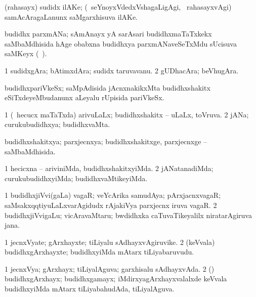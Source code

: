 \bentry
{}
\gl{\nA}
\bmng
(rahasayx) sudidx ilAKe; (\kanmu\ seYnoyxVdedxVshagaLigAgi, \kanmu\ rahasayxvAgi) samAcAragaLanunx saMgarxhisuva ilAKe. 
\emng
\eentry

\bentry
{}
\gl{\nA}
\bmng
budidhx parxmANa; sAmAnayx yA sarAsari budidhxmaTaTxkekx saMbaMdhisida hAge obabxna budidhxya parxmANaveSeTxMdu sUcisuva saMKeyx (\saMkiSx\ ). 
\emng
\eentry

\bentry
{}
\gl{\nA}
\bmng
\bnum
\num{1} sudidxgAra; bAtimxdAra; sudidx taruvavanu. 
\num{2} gUDhacAra; beVhugAra. 
\enum
\emng
\eentry

\bentry
{}
\gl{\nA}
\bmng
budidhxpariVkeSx; saMpAdisida jAcnxnakikxMta budidhxshakitx eSiTxdeyeMbudanunx aLeyalu rUpisida pariVkeSx. 
\emng
\eentry

\bentry
{}
\gl{\gu}
\bmng
\bnum
\num{1} (\sA\ hecucx maTaTxda) arivuLaLx; budidhxshakitx -- uLaLx, toVruva. 
\num{2} jANa; curukubudidhxya; budidhxvaMta. 
\enum
\emng
\eentry

\bentry
{}
\gl{\gu}
\bmng
budidhxshakitxya; parxjecnxya; budidhxshakitxge, parxjecnxge -- saMbaMdhisida. 
\emng
\eentry

\bentry
{}
\gl{\kirxvi}
\bmng
\bnum
\num{1} hecicxna -- ariviniMda, budidhxshakitxyiMda. 
\num{2} jANatanadiMda; curukubudidhxyiMda; budidhxvaMtikeyiMda. 
\enum
\emng
\eentry

\bentry
{}
\gl{\nA}
\bmng
\bnum
\num{1} budidhxjiVvi(gaLa) vagaR; veYcArika samudAya; pArxjacnxvagaR; saMsakxqqtiyuLaLxvarAgidudx rAjakiVya parxjecnx iruva vagaR. 
\num{2} budidhxjiVvigaLu; vicAravaMtaru; bwdidhxka caTuvaTikeyalilx niratarAgiruva jana. 
\enum
\emng
\eentry

\bentry
{}
\gl{\nA}
\bmng
\bnum
\num{1} jecnxVyate; gArxhayxte; tiLiyalu sAdhayxvAgiruvike. 
\num{2} (keVvala) budidhxgArxhayxte; budidhxyiMda mAtarx tiLiyabaruvudu. 
\enum
\emng
\eentry

\bentry
{}
\gl{\gu}
\bmng
\bnum
\num{1} jecnxVya; gArxhayx; tiLiyalAguva; garxhisalu sAdhayxvAda. 
\num{2} (\tashA) budidhxgArxhayx; budidhxgamayx; iMdirxyagArxhayxvalalxde keVvala budidhxyiMda mAtarx tiLiyabahudAda, tiLiyalAguva. 
\enum
\emng
\eentry

